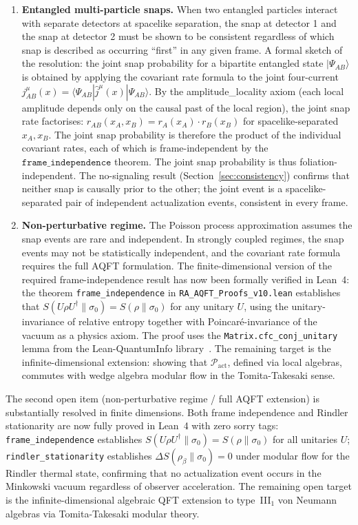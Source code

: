 \documentclass[11pt,a4paper]{article}
\theoremstyle{plain}
\theoremstyle{definition}
\theoremstyle{remark}
\begin{document}
\begin{enumerate}[leftmargin=*]
  \item \textbf{Entangled multi-particle snaps.} When two entangled particles
  interact with separate detectors at spacelike separation, the snap at detector 1
  and the snap at detector 2 must be shown to be consistent regardless of which
  snap is described as occurring ``first'' in any given frame.
  A formal sketch of the resolution: the joint snap probability for a
  bipartite entangled state $|\Psi_{AB}\rangle$ is obtained by applying
  the covariant rate formula to the joint four-current
  $j^\mu_{AB}(x) = \langle \Psi_{AB}|\hat{j}^\mu(x)|\Psi_{AB}\rangle$.
  By the amplitude\_locality axiom (each local amplitude depends only on
  the causal past of the local region), the joint snap rate factorises:
  $r_{AB}(x_A, x_B) = r_A(x_A) \cdot r_B(x_B)$ for spacelike-separated
  $x_A, x_B$. The joint snap probability is therefore the product of the
  individual covariant rates, each of which is frame-independent by the
  $\texttt{frame\_independence}$ theorem. The joint snap probability is thus
  foliation-independent. The no-signaling result
  (Section~\ref{sec:consistency}) confirms that neither snap is causally
  prior to the other; the joint event is a spacelike-separated pair of
  independent actualization events, consistent in every frame.

  \item \textbf{Non-perturbative regime.} The Poisson process approximation
  assumes the snap events are rare and independent. In strongly coupled regimes,
  the snap events may not be statistically independent, and the covariant rate
  formula requires the full AQFT formulation. The finite-dimensional version of
  the required frame-independence result has now been formally verified in
  Lean~4: the theorem \texttt{frame\_independence} in
  \texttt{RA\_AQFT\_Proofs\_v10.lean} establishes that
  $S(U\rho U^\dagger \| \sigma_0) = S(\rho \| \sigma_0)$ for any unitary $U$,
  using the unitary-invariance of relative entropy together with
  Poincar\'{e}-invariance of the vacuum as a physics axiom. The proof uses the
  \texttt{Matrix.cfc\_conj\_unitary} lemma from the Lean-QuantumInfo
  library~\citep{Meiburg2025LQI}. The remaining target is the
  infinite-dimensional extension: showing that
  $\mathcal{P}_{\mathrm{act}}$, defined via local algebras, commutes with wedge
  algebra modular flow in the Tomita-Takesaki sense.
\end{enumerate}

The second open item (non-perturbative regime / full AQFT extension) is
substantially resolved in finite dimensions. Both frame independence and
Rindler stationarity are now fully proved in Lean~4 with zero sorry tags:
\texttt{frame\_independence} establishes $S(U\rho U^\dagger\|\sigma_0)
= S(\rho\|\sigma_0)$ for all unitaries $U$; \texttt{rindler\_stationarity}
establishes $\Delta S(\rho_\beta\|\sigma_0) = 0$ under modular flow for
the Rindler thermal state, confirming that no actualization event occurs
in the Minkowski vacuum regardless of observer acceleration.
The remaining open target is the infinite-dimensional algebraic QFT extension
to type~III$_1$ von Neumann algebras via Tomita-Takesaki modular theory.
\end{document}
